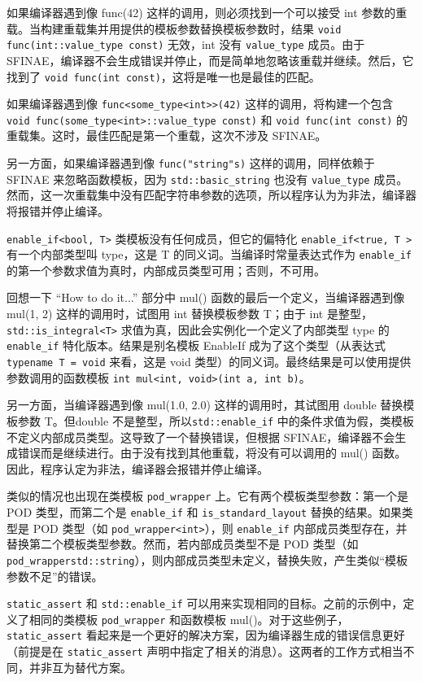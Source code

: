 如果编译器遇到像 func(42) 这样的调用，则必须找到一个可以接受 int 参数的重载。当构建重载集并用提供的模板参数替换模板参数时，结果 \verb|void func(int::value_type const)| 无效，int 没有 \verb|value_type| 成员。由于 SFINAE，编译器不会生成错误并停止，而是简单地忽略该重载并继续。然后，它找到了 \verb|void func(int const)|，这将是唯一也是最佳的匹配。

如果编译器遇到像 \verb|func<some_type<int>>(42)| 这样的调用，将构建一个包含 \verb|void func(some_type<int>::value_type const)| 和 \verb|void func(int const)| 的重载集。这时，最佳匹配是第一个重载，这次不涉及 SFINAE。

另一方面，如果编译器遇到像 \verb|func("string"s)| 这样的调用，同样依赖于 SFINAE 来忽略函数模板，因为 \verb|std::basic_string| 也没有 \verb|value_type| 成员。然而，这一次重载集中没有匹配字符串参数的选项，所以程序认为为非法，编译器将报错并停止编译。

\verb|enable_if<bool, T>| 类模板没有任何成员，但它的偏特化 \verb|enable_if<true, T >| 有一个内部类型叫 type，这是 T 的同义词。当编译时常量表达式作为 \verb|enable_if| 的第一个参数求值为真时，内部成员类型可用；否则，不可用。

回想一下 “How to do it...” 部分中 mul() 函数的最后一个定义，当编译器遇到像 mul(1, 2) 这样的调用时，试图用 int 替换模板参数 T；由于 int 是整型，\verb|std::is_integral<T>| 求值为真，因此会实例化一个定义了内部类型 type 的 \verb|enable_if| 特化版本。结果是别名模板 EnableIf 成为了这个类型（从表达式 \verb|typename T = void| 来看，这是 void 类型）的同义词。最终结果是可以使用提供参数调用的函数模板 \verb|int mul<int, void>(int a, int b)|。

另一方面，当编译器遇到像 mul(1.0, 2.0) 这样的调用时，其试图用 double 替换模板参数 T。但double 不是整型，所以\verb|std::enable_if| 中的条件求值为假，类模板不定义内部成员类型。这导致了一个替换错误，但根据 SFINAE，编译器不会生成错误而是继续进行。由于没有找到其他重载，将没有可以调用的 mul() 函数。因此，程序认定为非法，编译器会报错并停止编译。

类似的情况也出现在类模板 \verb|pod_wrapper| 上。它有两个模板类型参数：第一个是 POD 类型，而第二个是 \verb|enable_if| 和 \verb|is_standard_layout| 替换的结果。如果类型是 POD 类型（如 \verb|pod_wrapper<int>|），则 \verb|enable_if| 内部成员类型存在，并替换第二个模板类型参数。然而，若内部成员类型不是 POD 类型（如 \verb|pod_wrapperstd::string|），则内部成员类型未定义，替换失败，产生类似“模板参数不足”的错误。


\verb|static_assert| 和 \verb|std::enable_if| 可以用来实现相同的目标。之前的示例中，定义了相同的类模板 \verb|pod_wrapper| 和函数模板 mul()。对于这些例子，\verb|static_assert| 看起来是一个更好的解决方案，因为编译器生成的错误信息更好（前提是在 \verb|static_assert| 声明中指定了相关的消息）。这两者的工作方式相当不同，并非互为替代方案。

